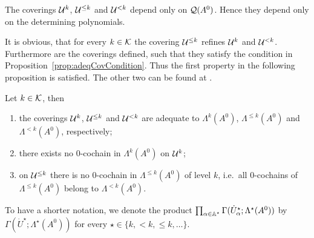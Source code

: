 \begin{rem}
  The coverings $\mathcal{U}^{k}$, $\mathcal{U}^{\leq k}$ and $\mathcal{U}^{<k}$ depend only on
  $\mathcal{Q}(A^0)$. Hence they depend only on the determining polynomials.
\end{rem}
It is obvious, that for every $k\in\mathcal{K}$ the covering $\mathcal{U}^{\leq k}$ refines
$\mathcal{U}^{k}$ and $\mathcal{U}^{<k}$.
Furthermore are the coverings defined, such that they satisfy the
condition in Proposition~\ref{prop:adeqCovCondition}.
Thus the first property in the following proposition is satisfied. The other
two can be found at \cite[Prop.II.3.1 (iv)]{Loday1994}.
\begin{prop}\label{prop:adequateProperties}
  Let $k\in\mathcal{K}$, then
  \begin{enumerate}
    \item the coverings $\mathcal{U}^{k}$, $\mathcal{U}^{\leq k}$ and $\mathcal{U}^{<k}$ are adequate
      to $\Lambda^k(A^0)$, $\Lambda^{\leq k}(A^0)$ and $\Lambda^{<k}(A^0)$, respectively;
    \item there exists no $0$-cochain in $\Lambda^k(A^0)$ on $\mathcal{U}^k$;
    \item on $\mathcal{U}^{\leq k}$ there is no $0$-cochain in $\Lambda^{\leq k}(A^0)$
      of level $k$, i.e.\ all $0$-cochains of $\Lambda^{\leq k}(A^0)$ belong to
      $\Lambda^{<k}(A^0)$.
  \end{enumerate}
\end{prop}
To have a shorter notation, we denote the product
$\prod_{\alpha\in\mathbb{A}^\star}\Gamma(\dot U_\alpha^\star;\Lambda^\star(A^0))$ by
$\Gamma(\dot U^\star;\Lambda^\star(A^0))$ for every
$\star\in\{k,<k,\leq k,\dots\}$.

